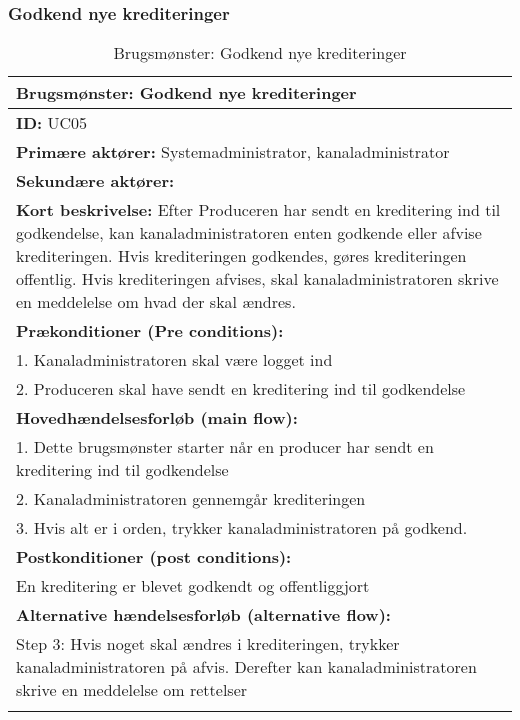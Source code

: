 \subsubsection{Godkend nye krediteringer}
\begin{longtable}[h]{|p{16cm}|}
    \hline
    \textbf{Brugsmønster:}  Godkend nye krediteringer \\ 
    \hline
	\textbf{ID:} UC05 \\ 
	\hline
	\textbf{Primære aktører:} Systemadministrator, kanaladministrator \\ \hline
	\textbf{Sekundære aktører:} \\ \hline
	\textbf{Kort beskrivelse:} Efter Produceren har sendt en kreditering ind til godkendelse, kan kanaladministratoren enten godkende eller afvise krediteringen. Hvis krediteringen godkendes, gøres krediteringen offentlig. Hvis krediteringen afvises, skal kanaladministratoren skrive en meddelelse om hvad der skal ændres. \\ \hline
	\textbf{Prækonditioner (Pre conditions):} \\
	1. Kanaladministratoren skal være logget ind \\ 
	2. Produceren skal have sendt en kreditering ind til godkendelse \\
	\hline
\textbf{Hovedhændelsesforløb (main flow):} \\
1. Dette brugsmønster starter når en producer har sendt en kreditering ind til godkendelse \\ 
2. Kanaladministratoren gennemgår krediteringen \\ 
3. Hvis alt er i orden, trykker kanaladministratoren på godkend.\\ \hline
\textbf{Postkonditioner (post conditions):} \\
    En kreditering er blevet godkendt og offentliggjort \\ \hline
\textbf{Alternative hændelsesforløb (alternative flow):} \\
Step 3: Hvis noget skal ændres i krediteringen, trykker kanaladministratoren på afvis. Derefter kan kanaladministratoren skrive en meddelelse om rettelser \\
\hline
\caption{Brugsmønster: Godkend nye krediteringer}
\label{table:approve_credit}
\end{longtable}



